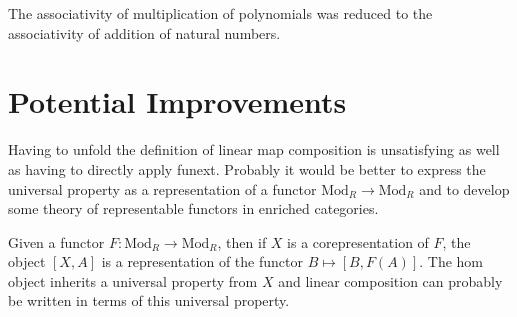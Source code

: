 \documentclass[12pt]{article} %
\theoremstyle{definition}
\theoremstyle{definition}
\theoremstyle{definition}
\theoremstyle{definition}
\begin{document}
The associativity of multiplication of polynomials was reduced to the associativity of addition
of natural numbers.

\section{Potential Improvements}

Having to unfold the definition of linear map composition is unsatisfying as well as having to 
directly apply funext. Probably it would be better to express the universal property as 
a representation of a functor $\text{Mod}_R \to \text{Mod}_R$ and to develop some
theory of representable functors in enriched categories.

Given a functor $F : \text{Mod}_R \to \text{Mod}_R$, then if $X$ is a corepresentation of $F$,
the object $[X, A]$ is a representation of the functor $B \mapsto [B, F(A)]$. The hom object 
inherits a universal property from $X$ and linear composition can probably be written in terms of this 
universal property.











  
\end{document}
